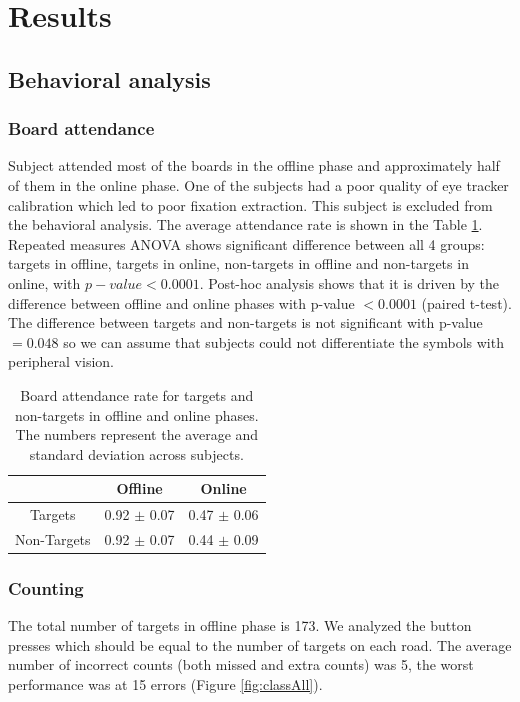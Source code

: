 \documentclass[12pt]{iopart}
\begin{document}
\section{Results}
\label{sec:results}
\subsection{Behavioral analysis}

\subsubsection*{Board attendance}
Subject attended most of the boards in the offline phase and approximately
half of them in the online phase. One of the subjects
had a poor quality of eye tracker calibration which led
to poor fixation extraction. This subject is excluded from the behavioral analysis.
The average attendance rate
is shown in the Table \ref{tab:boardAtt}. 
Repeated measures ANOVA shows significant difference between
all 4 groups: targets in offline, targets  in online,
non-targets in offline and non-targets in online, with $p-value < 0.0001$.
Post-hoc analysis shows that it is driven by the difference between
offline and online phases with p-value $< 0.0001$ (paired t-test).
The difference between targets and non-targets is not significant with p-value $= 0.048$
so we can assume that subjects could not differentiate the symbols
with peripheral vision.

\begin{table}
    \centering
    \caption{Board attendance rate for targets and non-targets in offline and online phases.
    The numbers represent the average and standard deviation across subjects.}
    \begin{tabular}{c | c | c}
        \hline 
        & Offline & Online \\
        \hline 
        Targets & 0.92 $\pm$ 0.07 & 0.47 $\pm$ 0.06 \\
        Non-Targets & 0.92 $\pm$ 0.07 & 0.44 $\pm$ 0.09 \\
        \hline 
    \end{tabular}
    \label{tab:boardAtt}
\end{table}

\subsubsection*{Counting}
The total number of targets in offline phase is 173.
We analyzed the button presses which should be equal to the number of targets
on each road.
The average number of incorrect counts (both missed and extra counts) was 5,
the worst performance was at 15 errors (Figure \ref{fig:classAll}).
\end{document}

